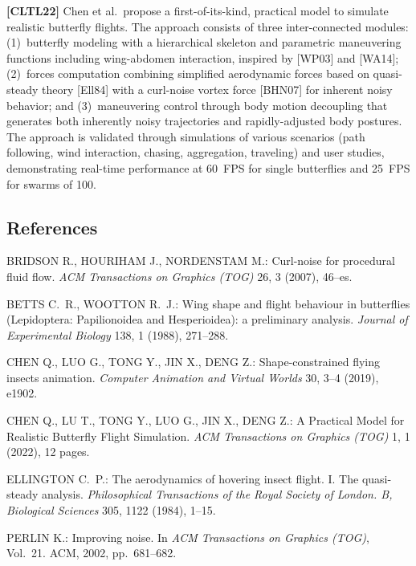 \documentclass[12pt]{article}
\begin{document}
\bigskip\noindent
\textbf{[CLTL22]} Chen et al.\ propose a first-of-its-kind, practical model to
simulate realistic butterfly flights. The approach consists of three
inter-connected modules: (1)~butterfly modeling with a hierarchical skeleton and
parametric maneuvering functions including wing-abdomen interaction, inspired by
[WP03] and [WA14]; (2)~forces computation combining simplified aerodynamic forces
based on quasi-steady theory [Ell84] with a curl-noise vortex force [BHN07] for
inherent noisy behavior; and (3)~maneuvering control through body motion
decoupling that generates both inherently noisy trajectories and rapidly-adjusted
body postures. The approach is validated through simulations of various scenarios
(path following, wind interaction, chasing, aggregation, traveling) and user
studies, demonstrating real-time performance at 60~FPS for single butterflies
and 25~FPS for swarms of 100.

\subsection*{References}

\noindent
[BHN07] BRIDSON R., HOURIHAM J., NORDENSTAM M.: Curl-noise for
procedural fluid flow. \textit{ACM Transactions on Graphics (TOG)} 26, 3
(2007), 46--es.

\medskip\noindent
[BW88] BETTS C.~R., WOOTTON R.~J.: Wing shape and flight behaviour in
butterflies (Lepidoptera: Papilionoidea and Hesperioidea): a preliminary
analysis. \textit{Journal of Experimental Biology} 138, 1 (1988), 271--288.

\medskip\noindent
[CLTJ19] CHEN Q., LUO G., TONG Y., JIN X., DENG Z.: Shape-constrained
flying insects animation. \textit{Computer Animation and Virtual Worlds} 30,
3--4 (2019), e1902.

\medskip\noindent
[CLTL22] CHEN Q., LU T., TONG Y., LUO G., JIN X., DENG Z.: A Practical
Model for Realistic Butterfly Flight Simulation. \textit{ACM Transactions on
Graphics (TOG)} 1, 1 (2022), 12 pages.

\medskip\noindent
[Ell84] ELLINGTON C.~P.: The aerodynamics of hovering insect flight. I.
The quasi-steady analysis. \textit{Philosophical Transactions of the Royal
Society of London. B, Biological Sciences} 305, 1122 (1984), 1--15.

\medskip\noindent
[Per02] PERLIN K.: Improving noise. In \textit{ACM Transactions on Graphics
(TOG)}, Vol.~21. ACM, 2002, pp.~681--682.
\end{document}
